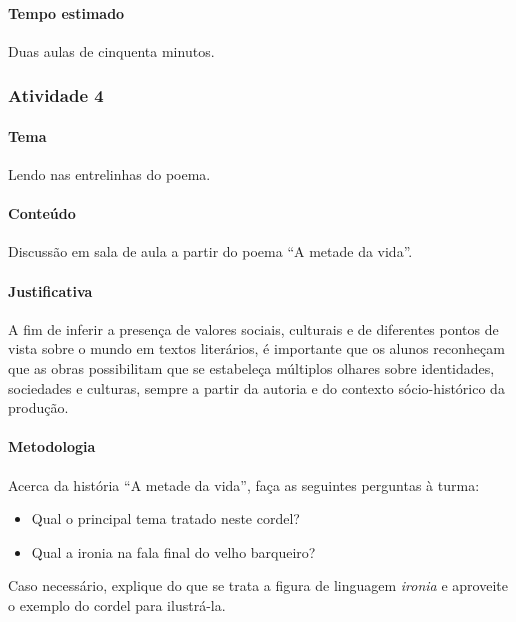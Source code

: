 \documentclass[11pt]{extarticle}
\begin{document}
\paragraph{Tempo estimado} Duas aulas de cinquenta minutos.


\subsubsection{Atividade 4}


\paragraph{Tema} Lendo nas entrelinhas do poema.

\paragraph{Conteúdo} Discussão em sala de aula a partir do poema ``A metade da vida''.

\paragraph{Justificativa} A fim de inferir a presença de valores sociais, 
culturais e de diferentes pontos de vista sobre o mundo em textos literários,
é importante que os alunos reconheçam que as obras possibilitam 
que se estabeleça múltiplos olhares sobre identidades, sociedades e culturas, 
sempre a partir da autoria e do contexto sócio-histórico da produção.

\paragraph{Metodologia} Acerca da história ``A metade da vida'', faça as seguintes perguntas
à turma:

\begin{itemize}
\item Qual o principal tema tratado neste cordel? 
\item Qual a ironia na fala final do velho barqueiro?
\end{itemize}

Caso necessário, explique do que se trata a figura de linguagem \textit{ironia} e 
aproveite o exemplo do cordel para ilustrá-la.
\end{document}
